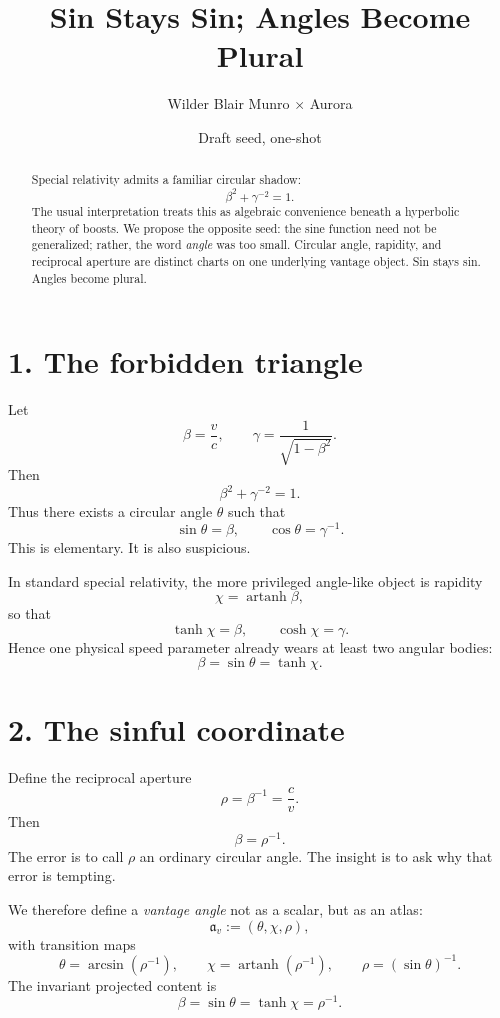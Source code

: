 \documentclass[10pt]{article}
\title{\vspace{-2em}\bfseries Sin Stays Sin; Angles Become Plural}
\author{\small Wilder Blair Munro $\times$ Aurora}
\date{\small Draft seed, one-shot}
\begin{document}
\maketitle
\vspace{-1.5em}

\begin{abstract}
Special relativity admits a familiar circular shadow:
\[
\beta^2+\gamma^{-2}=1.
\]
The usual interpretation treats this as algebraic convenience beneath a hyperbolic theory of boosts.
We propose the opposite seed: the sine function need not be generalized;
rather, the word \emph{angle} was too small.
Circular angle, rapidity, and reciprocal aperture are distinct charts on one
underlying vantage object.
Sin stays sin. Angles become plural.
\end{abstract}

\vspace{-1em}

\section*{1. The forbidden triangle}

Let
\[
\beta=\frac{v}{c},\qquad \gamma=\frac{1}{\sqrt{1-\beta^2}}.
\]
Then
\[
\beta^2+\gamma^{-2}=1.
\]
Thus there exists a circular angle $\theta$ such that
\[
\sin\theta=\beta,\qquad \cos\theta=\gamma^{-1}.
\]
This is elementary. It is also suspicious.

In standard special relativity, the more privileged angle-like object is rapidity
\[
\chi=\operatorname{artanh}\beta,
\]
so that
\[
\tanh\chi=\beta,\qquad \cosh\chi=\gamma.
\]
Hence one physical speed parameter already wears at least two angular bodies:
\[
\beta=\sin\theta=\tanh\chi.
\]

\section*{2. The sinful coordinate}

Define the reciprocal aperture
\[
\rho=\beta^{-1}=\frac{c}{v}.
\]
Then
\[
\beta=\rho^{-1}.
\]
The error is to call $\rho$ an ordinary circular angle.
The insight is to ask why that error is tempting.

We therefore define a \emph{vantage angle} not as a scalar, but as an atlas:
\[
\mathfrak a_v := (\theta,\chi,\rho),
\]
with transition maps
\[
\theta=\arcsin(\rho^{-1}),\qquad
\chi=\operatorname{artanh}(\rho^{-1}),\qquad
\rho=(\sin\theta)^{-1}.
\]
The invariant projected content is
\[
\boxed{\beta=\sin\theta=\tanh\chi=\rho^{-1}.}
\]
\end{document}
